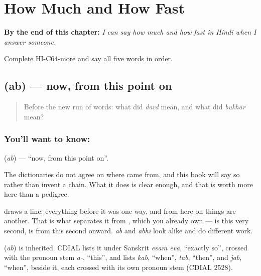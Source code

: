
\chapter{How Much and How Fast}
\label{ch:hi-how-much-and-how-fast}

\begin{chapteropening}
\textbf{By the end of this chapter:} \emph{I can say how much and how fast in Hindi when I answer someone.}

Complete HI-C64-more and say all five words in order.
\end{chapteropening}

\section[\texorpdfstring{\hi{अब} (ab)}{अब (ab)}]{ (ab) — now, from this point on}

\label{lesson:HI-C64-now}



\begin{quote}
Before the new run of words: what did \emph{dard} mean, and what did \emph{bukhār} mean?
\end{quote}

\subsection*{You'll want to know: }
\textbf{} (\emph{ab}) — \textquotedblleft{}now, from this point on\textquotedblright{}.

The dictionaries do not agree on where  came from, and this book will say so rather than invent a chain. What it does is clear enough, and that is worth more here than a pedigree.

 draws a line: everything before it was one way, and from here on things are another. That is what separates it from , which you already own —  is this very second,  is from this second onward. \emph{ab} and \emph{abhī} look alike and do different work.

\begin{cousinweb}
\textbf{} (\emph{ab}) is inherited. CDIAL lists it under Sanskrit \emph{evam eva}, \textquotedblleft{}exactly so\textquotedblright{}, crossed with the pronoun stem \emph{a-}, \textquotedblleft{}this\textquotedblright{}, and lists \emph{kab}, \textquotedblleft{}when\textquotedblright{}, \emph{tab}, \textquotedblleft{}then\textquotedblright{}, and \emph{jab}, \textquotedblleft{}when\textquotedblright{}, beside it, each crossed with its own pronoun stem (CDIAL 2528).
\end{cousinweb}

